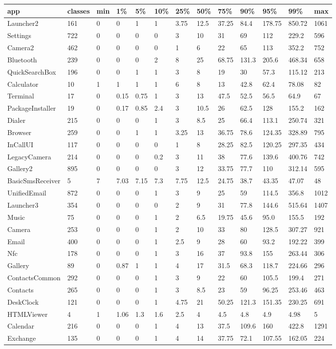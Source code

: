 \begin{tabular}{|l|l|l|l|l|l|l|l|l|l|l|l|l|}
\hline
app&classes&min&1\%&5\%&10\%&25\%&50\%&75\%&90\%&95\%&99\%&max\\
\hline
Launcher2&161&0&0&1&1&3.75&12.5&37.25&84.4&178.75&850.72&1061\\
\hline
Settings&722&0&0&0&0&3&10&31&69&112&229.2&596\\
\hline
Camera2&462&0&0&0&0&1&6&22&65&113&352.2&752\\
\hline
Bluetooth&239&0&0&0&2&8&25&68.75&131.3&205.6&468.34&658\\
\hline
QuickSearchBox&196&0&0&1&1&3&8&19&30&57.3&115.12&213\\
\hline
Calculator&10&1&1&1&1&6&8&13&42.8&62.4&78.08&82\\
\hline
Terminal&17&0&0.15&0.75&1&3&13&47.5&52.5&56.5&64.9&67\\
\hline
PackageInstaller&19&0&0.17&0.85&2.4&3&10.5&26&62.5&128&155.2&162\\
\hline
Dialer&215&0&0&0&1&3&8.5&25&66.4&113.1&250.74&321\\
\hline
Browser&259&0&0&1&1&3.25&13&36.75&78.6&124.35&328.89&795\\
\hline
InCallUI&117&0&0&0&0&1&8&28.25&82.5&120.25&297.35&434\\
\hline
LegacyCamera&214&0&0&0&0.2&3&11&38&77.6&139.6&400.76&742\\
\hline
Gallery2&895&0&0&0&0&3&12&33.75&77.7&110&312.14&595\\
\hline
BasicSmsReceiver&5&7&7.03&7.15&7.3&7.75&12.5&24.75&38.7&43.35&47.07&48\\
\hline
UnifiedEmail&872&0&0&0&1&3&9&25&59&114.5&356.8&1012\\
\hline
Launcher3&354&0&0&0&0&2&9&31&77.8&144.6&515.64&1407\\
\hline
Music&75&0&0&0&1&2&6.5&19.75&45.6&95.0&155.5&192\\
\hline
Camera&253&0&0&0&1&2&10&33&80&128.5&307.27&921\\
\hline
Email&400&0&0&0&1&2.5&9&28&60&93.2&192.22&399\\
\hline
Nfc&178&0&0&0&1&3&16&37&93.8&155&263.44&306\\
\hline
Gallery&89&0&0.87&1&1&4&17&31.5&68.3&118.7&224.66&296\\
\hline
ContactsCommon&292&0&0&0&1&3&9&22&60&105.5&199.4&271\\
\hline
Contacts&265&0&0&0&1&3&8.5&23&59&96.25&253.46&463\\
\hline
DeskClock&121&0&0&0&1&4.75&21&50.25&121.3&151.35&230.25&691\\
\hline
HTMLViewer&4&1&1.06&1.3&1.6&2.5&4&4.5&4.8&4.9&4.98&5\\
\hline
Calendar&216&0&0&0&1&4&13&37.5&109.6&160&422.8&1291\\
\hline
Exchange&135&0&0&0&1&4&14&37.75&72.1&107.55&162.05&224\\
\hline
\end{tabular}
